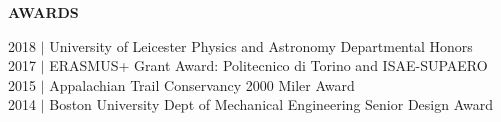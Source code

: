 \documentclass[10pt]{article}
\begin{document}
\begin{minipage}[t]{0.67\textwidth}
{\color{gray}
{\Large \uppercase{\textbf{Awards}}} \hspace{.1cm} \sout{\hfill} \\[-.4cm]   
}

\small
2018 $\vert$ University of Leicester Physics and Astronomy Departmental Honors\\
2017 $\vert$ ERASMUS+ Grant Award: Politecnico di Torino and ISAE-SUPAERO\\
2015 $\vert$ Appalachian Trail Conservancy 2000 Miler Award\\
2014 $\vert$ Boston University Dept of Mechanical Engineering Senior Design Award\\ 

\end{minipage}
\end{document}

